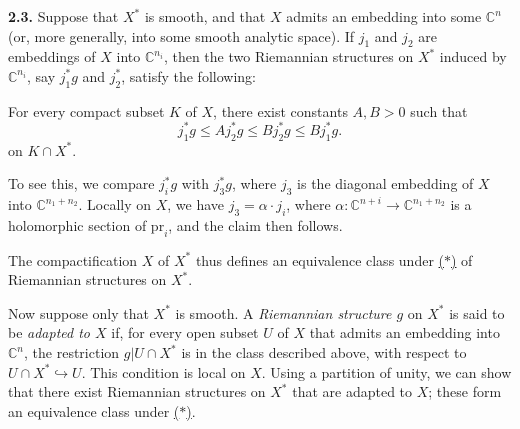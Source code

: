 \documentclass{report}
\newenvironment{itenv*}
  {\phantomsection\par\medskip\noindent\itshape}
  {\medskip}
\newenvironment{rmenv}[1]
  {\phantomsection\par\medskip\noindent\textbf{#1.}\rmfamily}
  {\medskip}
\newcommand{\CC}{\mathbb{C}}
\newcommand{\pr}{\mathrm{pr}}
\renewcommand{\leq}{\leqslant}
\begin{document}
\begin{rmenv}{2.3}
\label{II.2.3}
  Suppose that $X^*$ is smooth, and that $X$ admits an embedding into some $\CC^n$ (or, more generally, into some smooth analytic space).
  If $j_1$ and $j_2$ are embeddings of $X$ into $\CC^{n_i}$, then the two Riemannian structures on $X^*$ induced by $\CC^{n_i}$, say $j_1^*g$ and $j_2^*$, satisfy the following:

  \begin{itenv*}
  \label{II.2.3.*}
    For every compact subset $K$ of $X$, there exist constants $A,B>0$ such that
    \[
      j_1^*g \leq Aj_2^*g \leq Bj_2^*g \leq Bj_1^*g.
    \tag{$*$}
    \]
    on $K\cap X^*$.
  \end{itenv*}

  To see this, we compare $j_i^*g$ with $j_3^*g$, where $j_3$ is the diagonal embedding of $X$ into $\CC^{n_1+n_2}$.
  Locally on $X$, we have $j_3=\alpha\cdot j_i$, where $\alpha\colon\CC^{n+i}\to\CC^{n_1+n_2}$ is a holomorphic section of $\pr_i$, and the claim then follows.

  The compactification $X$ of $X^*$ thus defines an equivalence class under \hyperref[II.2.3.*]{($*$)} of Riemannian structures on $X^*$.

  Now suppose only that $X^*$ is smooth.
  A \emph{Riemannian structure $g$} on $X^*$ is said to be \emph{adapted to $X$} if, for every open subset $U$ of $X$ that admits an embedding into $\CC^n$, the restriction $g|U\cap X^*$ is in the class described above, with respect to $U\cap X^*\hookrightarrow U$.
  This condition is local on $X$.
  Using a partition of unity, we can show that there exist Riemannian structures on $X^*$ that are adapted to $X$;
  these form an equivalence class under \hyperref[II.2.3.*]{($*$)}.
\end{rmenv}
\end{document}
